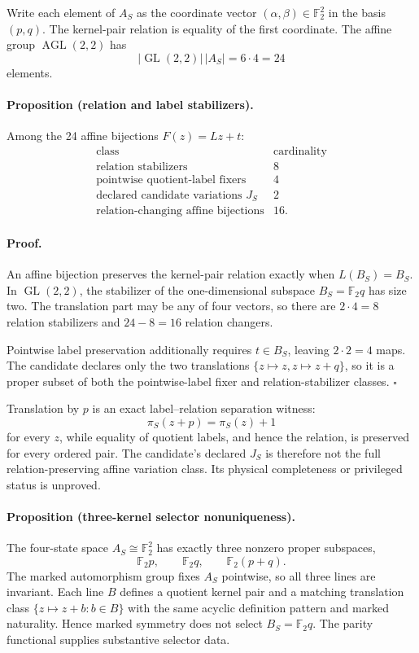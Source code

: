 Write each element of \(A_S\) as the coordinate vector
\((\alpha,\beta)\in\mathbb F_2^2\) in the basis \((p,q)\).  The kernel-pair
relation is equality of the first coordinate.  The affine group
\(\operatorname{AGL}(2,2)\) has
\[
 |\operatorname{GL}(2,2)|\,|A_S|=6\cdot4=24
\]
elements.

\paragraph{Proposition (relation and label stabilizers).}
Among the 24 affine bijections \(F(z)=Lz+t\):
\[
\begin{array}{c|c}
\text{class} & \text{cardinality}\\ \hline
\text{relation stabilizers} & 8\\
\text{pointwise quotient-label fixers} & 4\\
\text{declared candidate variations }J_S & 2\\
\text{relation-changing affine bijections} & 16 .
\end{array}
\]

\paragraph{Proof.}
An affine bijection preserves the kernel-pair relation exactly when
\(L(B_S)=B_S\).  In \(\operatorname{GL}(2,2)\), the stabilizer of the
one-dimensional subspace \(B_S=\mathbb F_2q\) has size two.  The translation
part may be any of four vectors, so there are \(2\cdot4=8\) relation
stabilizers and \(24-8=16\) relation changers.

Pointwise label preservation additionally requires \(t\in B_S\), leaving
\(2\cdot2=4\) maps.  The candidate declares only the two translations
\(\{z\mapsto z,z\mapsto z+q\}\), so it is a proper subset of both the
pointwise-label fixer and relation-stabilizer classes. \(\square\)

Translation by \(p\) is an exact label--relation separation witness:
\[
 \pi_S(z+p)=\pi_S(z)+1
\]
for every \(z\), while equality of quotient labels, and hence the relation,
is preserved for every ordered pair.  The candidate's declared \(J_S\) is
therefore not the full relation-preserving affine variation class.  Its
physical completeness or privileged status is unproved.

\paragraph{Proposition (three-kernel selector nonuniqueness).}
The four-state space \(A_S\cong\mathbb F_2^2\) has exactly three nonzero
proper subspaces,
\[
 \mathbb F_2p,\qquad \mathbb F_2q,\qquad \mathbb F_2(p+q).
\]
The marked automorphism group fixes \(A_S\) pointwise, so all three lines are
invariant.  Each line \(B\) defines a quotient kernel pair and a matching
translation class \(\{z\mapsto z+b:b\in B\}\) with the same acyclic
definition pattern and marked naturality.  Hence marked symmetry does not
select \(B_S=\mathbb F_2q\).  The parity functional supplies substantive
selector data.

